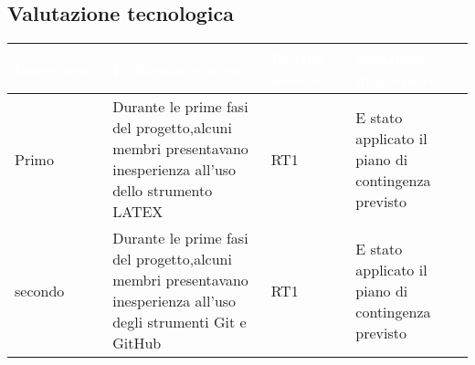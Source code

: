\newpage

\subsection{Valutazione tecnologica}
{
    \setlength{\freewidth}{\dimexpr\textwidth-10\tabcolsep}
    \renewcommand{\arraystretch}{1.5}
    \centering
    \setlength{\aboverulesep}{0pt}
    \setlength{\belowrulesep}{0pt}
    \begin{longtable}{C{.25\freewidth} C{.257\freewidth} C{.16\freewidth} C{.4\freewidth}}
       \toprule
    \textcolor{white}{\textbf{Incremento}}&
    \textcolor{white}{\textbf{Problema emerso}}&
    \textcolor{white}{\textbf{Rischio associato}}&
    \textcolor{white}{\textbf{Soluzione migliorativa}}\\	
    \toprule
    \endhead
    
Primo & Durante le prime fasi del progetto,alcuni membri presentavano inesperienza all'uso dello strumento LATEX & RT1 & E stato applicato il piano di contingenza
previsto \\
secondo & Durante le prime fasi del progetto,alcuni membri presentavano inesperienza all'uso degli strumenti Git e GitHub & RT1 & E stato applicato il piano di contingenza
previsto\\

 \bottomrule
\end{longtable}
}
